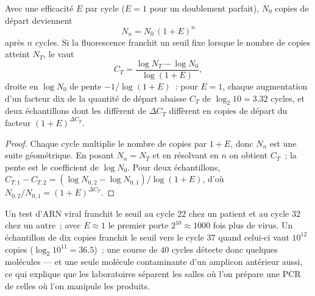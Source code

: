 \begin{theorem}\label{thm:b3:genetic-engineering:pcr}
Avec une efficacité $E$ par cycle ($E = 1$ pour un doublement parfait),
$N_{0}$ copies de départ deviennent
\[
N_{n} = N_{0}\,(1 + E)^{n}
\]
après $n$ cycles. Si la fluorescence franchit un seuil fixe lorsque le
nombre de copies atteint $N_{T}$, le \emph{} vaut
\[
C_{T} = \frac{\log N_{T} - \log N_{0}}{\log(1 + E)},
\]
droite en $\log N_{0}$ de pente $-1/\log(1+E)$~: pour $E = 1$, chaque
augmentation d'un facteur dix de la quantité de départ abaisse $C_{T}$
de $\log_{2} 10 = 3.32$ cycles, et deux échantillons dont les  diffèrent de $\Delta C_{T}$ diffèrent en copies de départ du
facteur $(1 + E)^{\Delta C_{T}}$.
\end{theorem}
\begin{proof}
Chaque cycle multiplie le nombre de copies par $1 + E$, donc $N_{n}$
est une suite géométrique. En posant $N_{n} = N_{T}$ et en résolvant en
$n$ on obtient $C_{T}$~; la pente est le coefficient de $\log N_{0}$.
Pour deux échantillons,
$C_{T,1} - C_{T,2} = (\log N_{0,2} - \log N_{0,1})/\log(1+E)$, d'où
$N_{0,2}/N_{0,1} = (1+E)^{\Delta C_{T}}$.
\end{proof}

\begin{example}\label{ex:b3:genetic-engineering:qpcr}
Un test d'ARN viral franchit le seuil au cycle $22$ chez un patient et
au cycle $32$ chez un autre~; avec $E \approx 1$ le premier porte $2^{10}
\approx 1000$ fois plus de virus. Un échantillon de dix copies franchit
le seuil vers le cycle $37$ quand celui-ci vaut $10^{12}$ copies
($\log_{2} 10^{11} =
36.5$)~; une course de $40$ cycles détecte donc quelques molécules ---
et une seule molécule contaminante d'un amplicon antérieur aussi, ce
qui explique que les laboratoires séparent les salles où l'on prépare
une PCR de celles où l'on manipule les produits.
\end{example}

